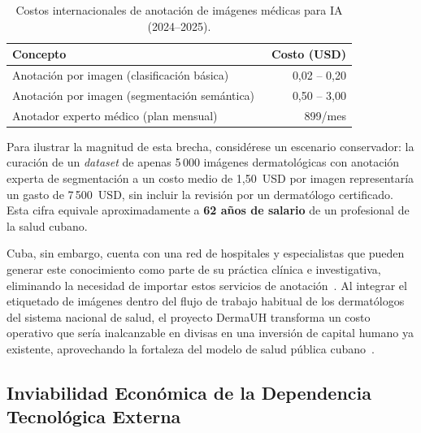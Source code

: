 \begin{table}[htbp]
\centering
\small
\caption{Costos internacionales de anotación de imágenes médicas para IA (2024--2025).}\label{tab:costos-anotacion}
\begin{tabular}{p{6.5cm}r}
\toprule
\textbf{Concepto} & \textbf{Costo (USD)} \\
\midrule
Anotación por imagen (clasificación básica)~\cite{annotationbox_pricing} & 0,02 -- 0,20 \\
Anotación por imagen (segmentación semántica)~\cite{annotationbox_pricing} & 0,50 -- 3,00 \\
Anotador experto médico (plan mensual)~\cite{getannotator_pricing} & 899/mes \\
\bottomrule
\end{tabular}
\end{table}

Para ilustrar la magnitud de esta brecha, considérese un escenario conservador: la curación de un 
\textit{dataset} de apenas 5\,000 imágenes dermatológicas con anotación experta de segmentación 
a un costo medio de 1,50~USD por imagen representaría un gasto de 7\,500~USD, sin incluir la 
revisión por un dermatólogo certificado. Esta cifra equivale 
aproximadamente a \textbf{62 años de salario} de un profesional de la salud cubano.

Cuba, sin embargo, cuenta con una red de hospitales y especialistas que pueden generar este conocimiento 
como parte de su práctica clínica e investigativa, eliminando la necesidad de importar estos servicios 
de anotación~\cite{fundacionuh_taller}. Al integrar el etiquetado de imágenes dentro del flujo de 
trabajo habitual de los dermatólogos del sistema nacional de salud, el proyecto DermaUH transforma un 
costo operativo que sería inalcanzable en divisas en una inversión de capital humano ya existente, 
aprovechando la fortaleza del modelo de salud pública cubano~\cite{pmc_ciencia_innovacion_cuba}.


\subsection{Inviabilidad Económica de la Dependencia Tecnológica Externa}\label{sec:inviabilidad-economica}

